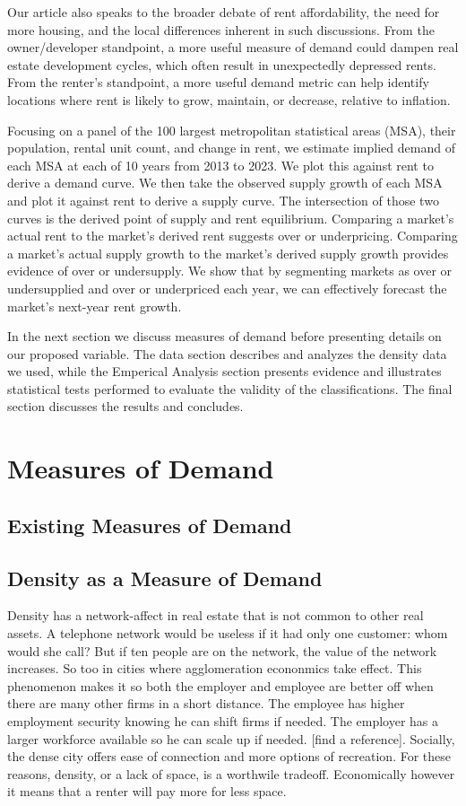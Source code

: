 \documentclass[sn-mathphys-num]{sn-jnl}%
\theoremstyle{thmstyleone}%
\theoremstyle{thmstyletwo}%
\theoremstyle{thmstylethree}%
\begin{document}
Our article also speaks to the broader debate of rent affordability, the need for more housing, and the local differences inherent in such discussions. From the owner/developer standpoint, a more useful measure of demand could dampen real estate development cycles, which often result in unexpectedly depressed rents. From the renter's standpoint, a more useful demand metric can help identify locations where rent is likely to grow, maintain, or decrease, relative to inflation.  

Focusing on a panel of the 100 largest metropolitan statistical areas (MSA), their population, rental unit count, and change in rent, we estimate implied demand of each MSA at each of 10 years from 2013 to 2023. We plot this against rent to derive a demand curve. We then take the observed supply growth of each MSA and plot it against rent to derive a supply curve. The intersection of those two curves is the derived point of supply and rent equilibrium. Comparing a market's actual rent to the market's derived rent suggests over or underpricing. Comparing a market's actual supply growth to the market's derived supply growth provides evidence of over or undersupply. We show that by segmenting markets as over or undersupplied and over or underpriced each year, we can effectively forecast the market's next-year rent growth.  

In the next section we discuss measures of demand before presenting details on our proposed variable. The data section describes and analyzes the density data we used, while the Emperical Analysis section presents evidence and illustrates statistical tests performed to evaluate the validity of the classifications. The final section discusses the results and concludes. 
 
\section{Measures of Demand}
\subsection{Existing Measures of Demand}
\subsection{Density as a Measure of Demand}
Density has a network-affect in real estate that is not common to other real assets. A telephone network would be useless if it had only one customer: whom would she call? But if ten people are on the network, the value of the network increases. So too in cities where agglomeration econonmics take effect. This phenomenon makes it so both the employer and employee are better off when there are many other firms in a short distance. The employee has higher employment security knowing he can shift firms if needed. The employer has a larger workforce available so he can scale up if needed. [find a reference]. Socially, the dense city offers ease of connection and more options of recreation. For these reasons, density, or a lack of space, is a worthwile tradeoff. Economically however it means that a renter will pay more for less space.
\end{document}
